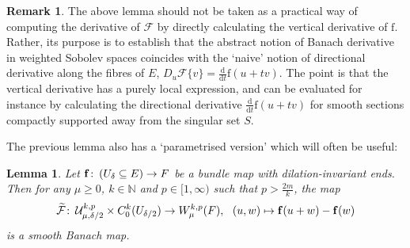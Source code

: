 \documentclass{article}
\numberwithin{equation}{section}        %
\theoremstyle{bfnote}
\newtheorem{lem}[thm]{Lemma}                %
\theoremstyle{definition}
\theoremstyle{bfremark}
\newtheorem{rem}[thm]{Remark}               %
\newcommand{\col}{\colon \thinspace}        %
\newcommand{\N}{\mathbb{N}}                 %
\newcommand{\diff}{\mathrm{d}}                      %
\newcommand{\bmap}[1]{\boldsymbol{\mathrm{#1}}}     %
\begin{document}
\begin{rem}     \label{rem: Derivative of Banach maps}
    The above lemma should not be taken as a practical way of computing the derivative of $\mathcal{F}$ by directly calculating the vertical derivative of $\bmap{f}$. Rather, its purpose is to establish that the abstract notion of Banach derivative in weighted Sobolev spaces coincides with the `naive' notion of directional derivative along the fibres of $E$, $D_u \mathcal{F}\{v\} = \tfrac{\diff}{\diff t} \bmap{f}(u+tv)$. The point is that the vertical derivative has a purely local expression, and can be evaluated for instance by calculating the directional derivative $\tfrac{\diff}{\diff t} \bmap{f}(u+tv)$ for smooth sections compactly supported away from the singular set $S$.
\end{rem}

The previous lemma also has a `parametrised version' which will often be useful: 

\begin{lem}     \label{lem: Parametrised master lemma}
    Let $\bmap{f} \col (U_\delta \subseteq E) \to F$ be a bundle map with dilation-invariant ends. Then for any $\mu \geq 0$, $k \in \N$ and $p \in [1,\infty)$ such that $p > \frac{2m}{k}$, the map
    \begin{equation*}
        \widetilde{\mathcal{F}} \col \mathcal{U}^{k,p}_{\mu,\delta/2} \times C^{k}_0(U_{\delta/2}) \to W^{k,p}_{\mu}(F), ~~ (u,w) \mapsto \bmap{f}(u+w) - \bmap{f}(w)
    \end{equation*}
    is a smooth Banach map.
\end{lem}
\end{document}
